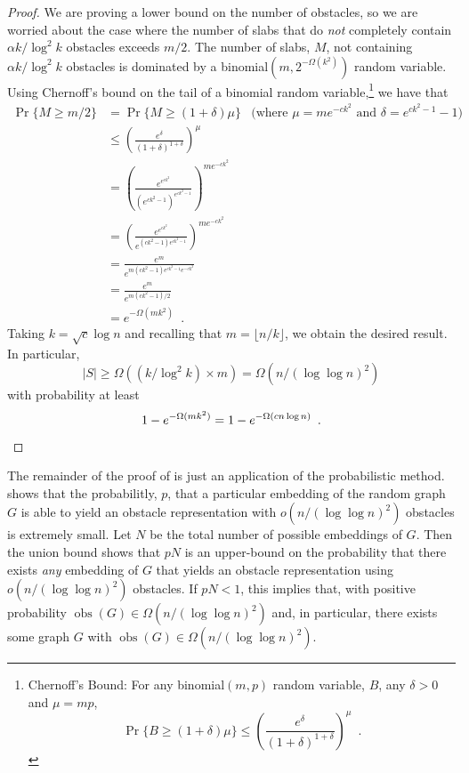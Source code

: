 \documentclass{patmorin}
\DeclareMathOperator{\obs}{obs}
\begin{document}
\begin{proof}
We are proving a lower bound on the number of obstacles, so we are worried
about the case where the number of slabs that do \emph{not} completely
contain $\alpha k/\log^2 k$ obstacles exceeds $m/2$.  The number of
slabs, $M$, not containing $\alpha k/\log^2 k$ obstacles is dominated
by a binomial$(m,2^{-\Omega(k^2)})$ random variable.  Using Chernoff's
bound on the tail of a binomial random
variable,\footnote{%
  Chernoff's Bound: For any binomial$(m,p)$ random variable, $B$,
  any $\delta>0$ and $\mu=mp$, 
  \[ \Pr\{B\ge (1+\delta)\mu\}
     \le \left(\frac{e^{\delta}}{(1+\delta)^{1+\delta}}\right)^{\mu} 
       \enspace . 
  \]}
we have that
\begin{align*}
  \Pr\{M \ge m/2\} & = \Pr\{M\ge (1+\delta)\mu\}
    & \text{(where $\mu=me^{-ck^2}$ and $\delta=e^{ck^2-1}-1$)} \\
    & \le \left(\frac{e^{\delta}}{(1+\delta)^{1+\delta}}\right)^{\mu} \\
    & = \left(\frac{e^{e^{ck^2}}}{(e^{ck^2-1})^{e^{ck^2-1}}}\right)^{me^{-ck^2}}\\
    & = \left(\frac{e^{e^{ck^2}}}{e^{(ck^2-1)e^{ck^2-1}}}\right)^{me^{-ck^2}}\\
    & = \frac{e^{m}}{e^{m(ck^2-1)e^{ck^2-1}e^{-ck^2}}} \\
    & = \frac{e^{m}}{e^{m(ck^2-1)/2}} \\
    & = e^{-\Omega(mk^2)} \enspace .
\end{align*}
Taking $k=\sqrt{c}\log n$ and recalling that $m=\lfloor n/k\rfloor$, we obtain
the desired result.  In particular,
\[
    |S| \ge \Omega\left(\left(k/\log^2 k\right)\times m \right)
      = \Omega\left(n/(\log\log n)^2\right)
\]
with probability at least
\[
    1-e^{-\Omega(mk^2)} = 1-e^{-\Omega(cn\log n)} \enspace . \qedhere
\]
\end{proof}

The remainder of the proof of  is just an application of
the probabilistic method.   shows that the probabilitly,
$p$, that a particular embedding of the random graph $G$ is able to
yield an obstacle representation with $o(n/(\log\log n)^2)$ obstacles
is extremely small.  Let $N$ be the total number of possible embeddings
of $G$.  Then the union bound shows that $p N$ is an upper-bound on the
probability that there exists \emph{any} embedding of $G$ that yields
an obstacle representation using $o(n/(\log\log n)^2)$ obstacles.
If $pN <1$, this implies that, with positive probability $\obs(G)\in
\Omega(n/(\log\log n)^2)$ and, in particular, there exists some graph $G$
with $\obs(G)\in \Omega(n/(\log\log n)^2)$.
\end{document}
